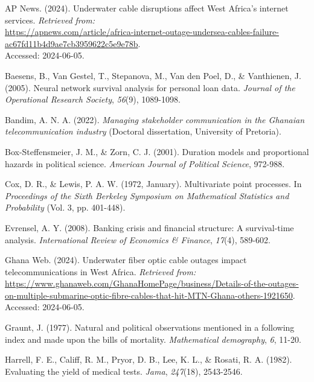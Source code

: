 \documentclass[doublespacing,12pt]{report}
\begin{document}
{\begin{enumerate}[label=\textbf{[\arabic*]}]
\item AP News. (2024). Underwater cable disruptions affect West Africa’s internet services. \textit{Retrieved from:} \\
\url{https://apnews.com/article/africa-internet-outage-undersea-cables-failure-ac67fd11b4d9ae7cb3959622c5e9e78b}. \\
Accessed: 2024-06-05.

    
    \item Baesens, B., Van Gestel, T., Stepanova, M., Van den Poel, D., \& Vanthienen, J. (2005). Neural network survival analysis for personal loan data. \textit{Journal of the Operational Research Society}, \textit{56}(9), 1089-1098. 
    
    \item Bandim, A. N. A. (2022). \textit{Managing stakeholder communication in the Ghanaian telecommunication industry} (Doctoral dissertation, University of Pretoria). 
    
    \item Box-Steffensmeier, J. M., \& Zorn, C. J. (2001). Duration models and proportional hazards in political science. \textit{American Journal of Political Science}, 972-988. 
    
    \item Cox, D. R., \& Lewis, P. A. W. (1972, January). Multivariate point processes. In \textit{Proceedings of the Sixth Berkeley Symposium on Mathematical Statistics and Probability} (Vol. 3, pp. 401-448). 
    
    \item Evrensel, A. Y. (2008). Banking crisis and financial structure: A survival-time analysis. \textit{International Review of Economics \& Finance}, \textit{17}(4), 589-602. 
    
    \item Ghana Web. (2024). Underwater fiber optic cable outages impact telecommunications in West Africa. \textit{Retrieved from:} \url{https://www.ghanaweb.com/GhanaHomePage/business/Details-of-the-outages-on-multiple-submarine-optic-fibre-cables-that-hit-MTN-Ghana-others-1921650}. Accessed: 2024-06-05.
    
    \item Graunt, J. (1977). Natural and political observations mentioned in a following index and made upon the bills of mortality. \textit{Mathematical demography}, \textit{6}, 11-20. 
    
    \item Harrell, F. E., Califf, R. M., Pryor, D. B., Lee, K. L., \& Rosati, R. A. (1982). Evaluating the yield of medical tests. \textit{Jama}, \textit{247}(18), 2543-2546. 
    

\end{enumerate}}
\end{document}
